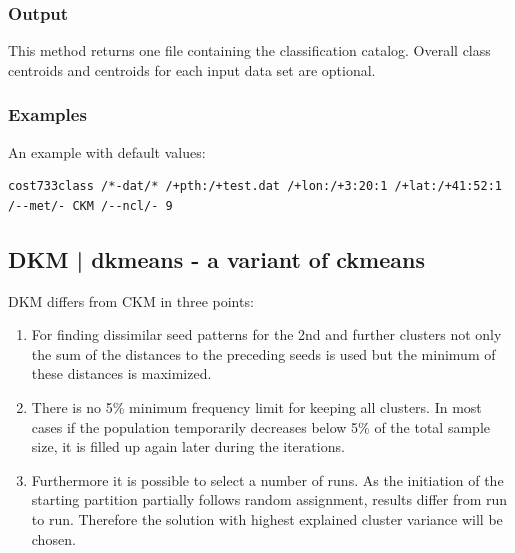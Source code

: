 \documentclass[12pt, oneside, a4paper, headsepline, plainheadsepline]{scrbook}
\begin{document}
\subsubsection*{Output}
This method returns one file containing the classification catalog. 
Overall class centroids and centroids for each input data set are optional.

\subsubsection*{Examples}
An example with default values:
\begin{lstlisting}
cost733class /*-dat/* /+pth:/+test.dat /+lon:/+3:20:1 /+lat:/+41:52:1 /--met/- CKM /--ncl/- 9
\end{lstlisting}

\subsection{DKM | dkmeans - a variant of ckmeans}

DKM differs from CKM in three points:

\begin{enumerate}
\item For finding dissimilar seed patterns for the 2nd and further clusters 
not only the sum of the distances to the preceding seeds is used but the minimum
of these distances is maximized.
\item There is no 5\% minimum frequency limit for keeping all clusters. In most cases if the population temporarily decreases below 5\% of the total sample size, it is filled up again later during the iterations.
\item Furthermore it is possible to select a number of runs. As the initiation of the starting partition partially follows random assignment, results differ from run to run. Therefore the solution with highest explained cluster variance will be chosen.
\end{enumerate}
\end{document}
